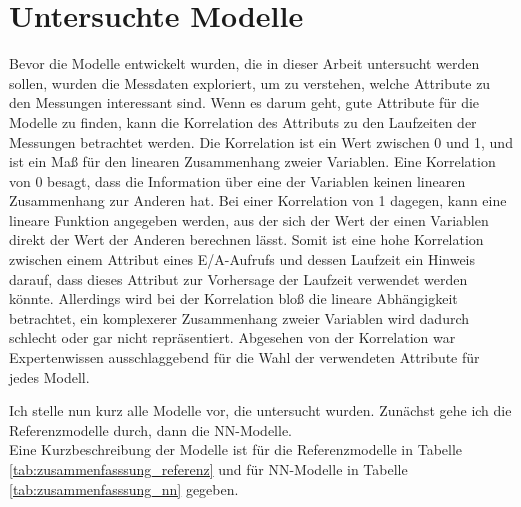 \documentclass[
	12pt,
	a4paper,
	BCOR10mm,
	DIV14,
	listof=totoc,
	bibliography=totoc,
	headsepline
]{scrreprt}
\begin{document}
\section{Untersuchte Modelle}
\label{analyse:modelle}
Bevor die Modelle entwickelt wurden, die in dieser Arbeit untersucht werden sollen, wurden die Messdaten exploriert, um zu verstehen, welche Attribute zu den Messungen interessant sind.
Wenn es darum geht, gute Attribute für die Modelle zu finden, kann die Korrelation des Attributs zu den Laufzeiten der Messungen betrachtet werden.
Die Korrelation ist ein Wert zwischen 0 und 1, und ist ein Maß für den linearen Zusammenhang zweier Variablen. Eine Korrelation von 0 besagt, dass die Information über eine der Variablen keinen linearen Zusammenhang zur Anderen hat.
Bei einer Korrelation von 1 dagegen, kann eine lineare Funktion angegeben werden, aus der sich der Wert der einen Variablen direkt der Wert der Anderen berechnen lässt. Somit ist eine hohe Korrelation zwischen einem Attribut eines E/A-Aufrufs und dessen Laufzeit ein Hinweis darauf, dass dieses Attribut zur Vorhersage der Laufzeit verwendet werden könnte. 
Allerdings wird bei der Korrelation bloß die lineare Abhängigkeit betrachtet, ein komplexerer Zusammenhang zweier Variablen wird dadurch schlecht oder gar nicht repräsentiert.
Abgesehen von der Korrelation war Expertenwissen ausschlaggebend für die Wahl der verwendeten Attribute für jedes Modell.

Ich stelle nun kurz alle Modelle vor, die untersucht wurden. Zunächst gehe ich die Referenzmodelle durch, dann die NN-Modelle.\\
Eine Kurzbeschreibung der Modelle ist für die Referenzmodelle in Tabelle \ref{tab:zusammenfasssung_referenz} und für NN-Modelle in Tabelle \ref{tab:zusammenfasssung_nn} gegeben.
\end{document}
